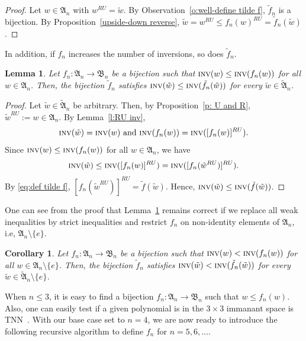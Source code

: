 \documentclass[12pt]{amsart}
\newtheorem{cor}[thm]{Corollary}
\newtheorem{lem}[thm]{Lemma}
\theoremstyle{definition}
\numberwithin{equation}{section}
\newcommand{\inv}{\textsc{inv}}
\newcommand{\defeq}{:=}
\begin{document}
\begin{proof}
    Let $w\in \mathfrak A_n$ with $w^{RU} = \tilde{w}$. By Observation~\ref{o:well-define tilde f}, $\tilde{f}_n$ is a bijection. By Proposition~\ref{upside-down reverse}, $\tilde{w} = w^{RU}  \leq f_n(w)^{RU} = \tilde{f}_n(\tilde{w})$.
\end{proof}

In addition, if $f_n$ increases the number of inversions, so does $\tilde{f}_n$.

\begin{lem}\label{l:inv tilde f}
    Let $f_n: \mathfrak A_n \rightarrow \mathfrak B_n$ be a bijection such that $\inv(w) \leq \inv(f_n(w))$ for all $w\in \mathfrak A_n$. Then, the bijection $\tilde{f}_n$ satisfies $\inv (\tilde{w}) \leq \inv (\tilde{f}_n(\tilde{w}))$ for every $\tilde{w} \in \tilde{\mathfrak A}_n$.
\end{lem}
\begin{proof}
    Let $\tilde{w} \in \tilde{\mathfrak A}_n$ be arbitrary. Then, by Proposition~\ref{p: U and R}, $\tilde{w}^{RU} \defeq w \in \mathfrak A_n$. By Lemma~\ref{l:RU inv},
     \begin{equation*}
        \inv (\tilde{w}) = \inv (w) \text{ and } \inv(f_n(w)) = \inv([f_n(w)]^{RU}).
    \end{equation*}Since $\inv(w) \leq \inv(f_n(w))$ for all $w\in \mathfrak A_n$, we have \begin{equation*}
        \inv (\tilde{w}) \leq  \inv([f_n(w)]^{RU}) = \inv([f_n(\tilde{w}^{RU})]^{RU}).
    \end{equation*}By \eqref{eq:def tilde f}, $[f_n(\tilde{w}^{RU})]^{RU} = \tilde{f}(\tilde{w})$. Hence, $\inv (\tilde{w}) \leq \inv (\tilde{f}(\tilde{w}))$.
\end{proof}

One can see from the proof that Lemma~\ref{l:inv tilde f} remains correct if we replace all weak inequalities by strict inequalities and restrict $f_{n}$ on non-identity elements of $\mathfrak A_n$, i.e, $\mathfrak A_n \setminus \{e\}$.
\begin{cor}\label{c:inv tilde f}
    Let $f_n: \mathfrak A_n \rightarrow \mathfrak B_n$ be a bijection such that $\inv(w) < \inv(f_n(w))$ for all $w\in \mathfrak A_n \setminus \{e\}$. Then, the bijection $\tilde{f}_n$ satisfies $\inv (\tilde{w}) < \inv (\tilde{f}_n(\tilde{w}))$ for every $\tilde{w} \in \tilde{\mathfrak A}_n \setminus \{e\}$.
\end{cor}

When $n\leq 3$, it is easy to find a bijection $f_n: \mathfrak A_n \rightarrow \mathfrak B_n$ such that $w\leq f_n(w)$. Also, one can easily
test if a given polynomial is in the $3 \times 3$ immanant space is TNN~\cite{SkanComm}.
With our base case set to $n=4$, we are now ready to introduce the following recursive algorithm to define $f_n$ for $n=5,6,\dotsc$.
\end{document}
